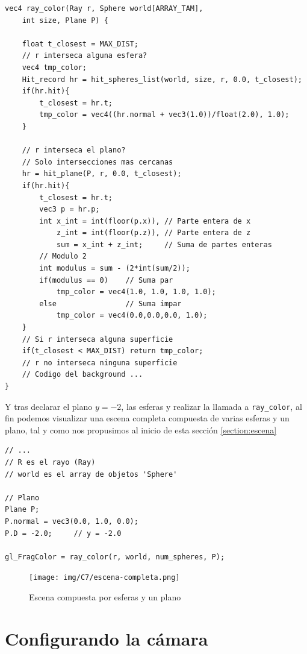 \begin{lstlisting}
vec4 ray_color(Ray r, Sphere world[ARRAY_TAM], 
    int size, Plane P) {
    
    float t_closest = MAX_DIST;   
    // r interseca alguna esfera?
    vec4 tmp_color;
    Hit_record hr = hit_spheres_list(world, size, r, 0.0, t_closest);
    if(hr.hit){
        t_closest = hr.t;
        tmp_color = vec4((hr.normal + vec3(1.0))/float(2.0), 1.0);
    }

    // r interseca el plano?
    // Solo intersecciones mas cercanas
    hr = hit_plane(P, r, 0.0, t_closest);
    if(hr.hit){
        t_closest = hr.t;
        vec3 p = hr.p;
        int x_int = int(floor(p.x)), // Parte entera de x
            z_int = int(floor(p.z)), // Parte entera de z
            sum = x_int + z_int;     // Suma de partes enteras
        // Modulo 2
        int modulus = sum - (2*int(sum/2));
        if(modulus == 0)    // Suma par
            tmp_color = vec4(1.0, 1.0, 1.0, 1.0);
        else                // Suma impar
            tmp_color = vec4(0.0,0.0,0.0, 1.0);
    }
    // Si r interseca alguna superficie
    if(t_closest < MAX_DIST) return tmp_color;
    // r no interseca ninguna superficie
    // Codigo del background ... 
}
\end{lstlisting}

Y tras declarar el plano $y=-2$, las esferas y realizar la llamada a \verb|ray_color|, al fin podemos visualizar una escena completa compuesta de varias esferas y un plano, tal y como nos propusimos al inicio de esta sección \ref{section:escena}

\begin{lstlisting}
// ... 
// R es el rayo (Ray)
// world es el array de objetos 'Sphere'

// Plano
Plane P;
P.normal = vec3(0.0, 1.0, 0.0);
P.D = -2.0;     // y = -2.0

gl_FragColor = ray_color(r, world, num_spheres, P);
\end{lstlisting}

\begin{figure} [ht]
    \centering
    \texttt{[image: img/C7/escena-completa.png]}
    \caption{Escena compuesta por esferas y un plano}
    \label{fig:escena-completa}
\end{figure}

\section{Configurando la cámara}
\label{section:camara}

